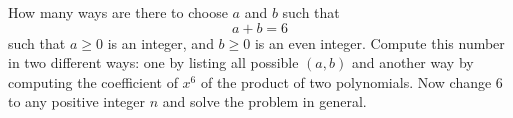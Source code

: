How many ways are there to choose $a$ and $b$ such that
\[
a + b = 6
\]
such that $a \geq 0$ is an integer, and
$b \geq 0$ is an even integer.
Compute this number in two different ways:
one by listing all possible $(a, b)$ and another way by 
computing the coefficient of $x^6$ of the product
of two polynomials.
Now change 6 to any positive integer $n$ and solve the
problem in general.
